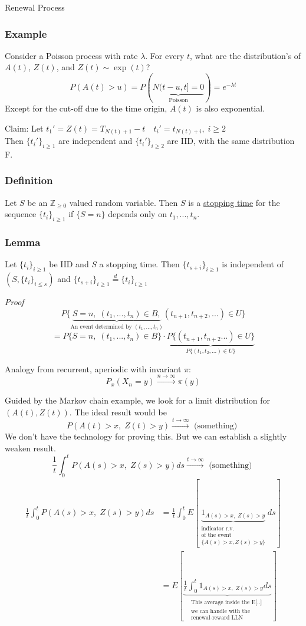 \documentclass[12pt]{article}
\begin{document}
\begin{section}{Renewal Process}
\subsubsection{Example} 
Consider a Poisson process with rate $\lambda$. For every $t$, what are the distribution's of $A(t)$, $Z(t)$, and $Z(t)\sim \exp(t)$?
$$P(A(t)> u) = P(\underbrace{N(t-u,t] = 0}_{\text{Poisson}})=e^{-\lambda t}$$
Except for the cut-off due to the time origin, $A(t)$ is also exponential.

Claim: Let $t_1' = Z(t) = T_{N(t)+1} -t \quad t_i' = t_{N(t)+i},\; i\ge 2$\\
Then $\{t_i'\}_{i\ge 1}$ are independent and $\{t_i'\}_{i\ge 2}$ are IID, with the same distribution F.

\subsubsection{Definition} Let  $S$ be an $\mathbb{Z}_{\ge 0}$ valued random variable. Then $S$ is a \underline{stopping time} for the sequence $\{t_i\}_{i\ge 1}$ if $\{S=n\}$ depends only on $t_1, ..., t_n$.

\subsubsection{Lemma} Let $\{t_i\}_{i\ge 1}$ be IID and $S$ a stopping time. Then $\{t_{s+i}\}_{i\ge 1}$ is independent of $(S, \{t_i\}_{i\le s})$ and $\{t_{s+i}\}_{i\ge 1} \overset{d}{=} \{t_i\}_{i\ge 1}$

\vspace{2\baselineskip}
{\sl Proof}\\
$$P\{\underbrace{S=n,\; (t_1,...,t_n)\in B,}_{\text{An event determined by $(t_1,...,t_n)$}} (t_{n+1},t_{n+2},...)\in U\}$$
$$=P\{S=n,\;(t_1,...,t_n)\in B\}\cdot \underbrace{P\{(t_{n+1},t_{n+2}...)\in U\}}_{P\{(t_1,t_2,...)\in U\}}$$

\newpage
Analogy from recurrent, aperiodic with invariant $\pi$:
$$P_x(X_n=y)\xrightarrow{n\to\infty} \pi(y)$$

Guided by the Markov chain example, we look for a limit distribution for $(A(t), Z(t)).$ The ideal result would be 
$$P(A(t)>x,\;Z(t)>y)\xrightarrow{t\to\infty} \text{ (something) }$$
We don't have the technology for proving this. But we can establish a slightly weaken result.
$$\frac{1}{t}\int_0^t P(A(s)>x,\;Z(s)>y)ds \xrightarrow{t\to\infty}\text{ (something) }$$
\begin{align}
    \frac{1}{t}\int_0^t P(A(s)>x,\;Z(s)>y)ds & = \frac{1}{t}\int_0^t E[\underbrace{1_{A(s)>x,\;Z(s)>y}}_{\substack{\text{indicator r.v.} \\ \text{of the event} \\ \text{$\{A(s)>x,Z(s)>y\}$}}}ds] \nonumber \\
    &=E[\underbrace{\frac{1}{t}\int_0^t 1_{A(s)>x,\;Z(s)>y}ds}_{\substack{
    \text{This average inside the E[..] } \\ \text{we can handle with the} \\ \text{renewal-reward LLN}    }}] \nonumber
\end{align}


\end{section}
\end{document}
